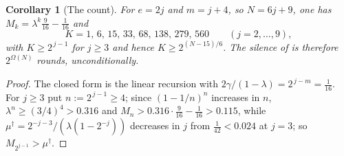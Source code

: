 \documentclass[11pt]{article}
\theoremstyle{plain}
\newtheorem{corollary}[theorem]{Corollary}
\theoremstyle{definition}
\begin{document}
\begin{corollary}[The count]\label{cor:wedge-count}
For $e=2j$ and $m=j+4$, so $N=6j+9$, one has
$M_k=\lambda^k\tfrac9{16}-\tfrac1{16}$ and
\[
  K=1,\,6,\,15,\,33,\,68,\,138,\,279,\,560\qquad(j=2,\dots,9),
\]
with $K\ge2^{\,j-1}$ for $j\ge3$ and hence $K\ge2^{(N-15)/6}$. The
silence of  is therefore $2^{\Omega(N)}$ rounds,
unconditionally.
\end{corollary}

\begin{proof}
The closed form is the linear recursion with
$2\gamma/(1-\lambda)=2^{\,j-m}=\tfrac1{16}$. For $j\ge3$ put
$n:=2^{\,j-1}\ge4$; since $(1-1/n)^n$ increases in $n$,
$\lambda^n\ge(3/4)^4>0.316$ and $M_n>0.316\cdot\tfrac9{16}-\tfrac1{16}>0.115$,
while $\mu^{\dagger}=2^{-j-3}/(\lambda(1-2^{-j}))$ decreases in $j$ from
$\tfrac1{42}<0.024$ at $j=3$; so $M_{2^{j-1}}>\mu^{\dagger}$.
\end{proof}
\end{document}
